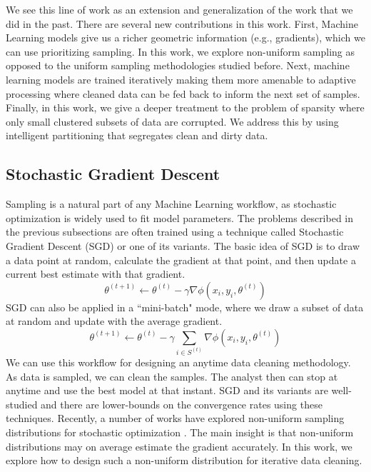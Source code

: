 We see this line of work as an extension and generalization of the work that we did in the past.
There are several new contributions in this work.
First, Machine Learning models give us a richer geometric information (e.g., gradients), which we can use 
prioritizing sampling.
In this work, we explore non-uniform sampling as opposed to the uniform sampling methodologies studied before.
Next, machine learning models are trained iteratively making them more amenable to adaptive processing where cleaned data can be fed back to inform the next set of samples.
Finally, in this work, we give a deeper treatment to the problem of sparsity where only small clustered subsets of data are corrupted.
We address this by using intelligent partitioning that segregates clean and dirty data.

\subsection{Stochastic Gradient Descent}
Sampling is a natural part of any Machine Learning workflow, as stochastic optimization is widely used to fit model parameters.
The problems described in the previous subsections are often trained using a technique called Stochastic Gradient Descent (SGD) or one of its variants.
The basic idea of SGD is to draw a data point at random, calculate the gradient at that point, and then update a current best estimate with that gradient.
\[
\theta^{(t+1)}\leftarrow\theta^{(t)}-\gamma\nabla\phi(x_{i},y_{i},\theta^{(t)})
\]
 SGD can also be applied in a ``mini-batch" mode, where we draw a subset of data at random and update with the average gradient.
 \[
 \theta^{(t+1)}\leftarrow\theta^{(t)}-\gamma\sum_{i\in S^{(t)}}\nabla\phi(x_{i},y_{i},\theta^{(t)})
 \]
We can use this workflow for designing an anytime data cleaning methodology.
As data is sampled, we can clean the samples.
The analyst then can stop at anytime and use the best model at that instant.
SGD and its variants are well-studied and there are lower-bounds on the convergence rates using these techniques. 
Recently, a number of works have explored non-uniform sampling distributions for stochastic optimization \cite{zhao2014stochastic, qu2014randomized}.
The main insight is that non-uniform distributions may on average estimate the gradient accurately.
In this work, we explore how to design such a non-uniform distribution for iterative data cleaning.






 